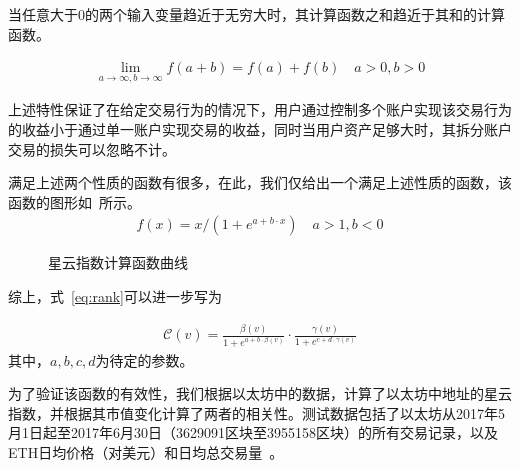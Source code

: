 \begin{property}
\label{prop:two}
当任意大于$0$的两个输入变量趋近于无穷大时，其计算函数之和趋近于其和的计算函数。
\end{property}

\begin{align}
\lim\limits_{a \to \infty, b\to \infty} f(a+b) = f(a) + f(b)\quad a>0, b>0
\end{align}

\noindent 上述特性保证了在给定交易行为的情况下，用户通过控制多个账户实现该交易行为的收益小于通过单一账户实现交易的收益，同时当用户资产足够大时，其拆分账户交易的损失可以忽略不计。

\noindent 满足上述两个性质的函数有很多，在此，我们仅给出一个满足上述性质的函数，该函数的图形如~所示。
\begin{align}
f(x) = x/(1 + e^{a + b\cdot x}) \quad a>1,b<0
\end{align}

\begin{figure}
\centering
{}
\caption{星云指数计算函数曲线 \label{fig-nr}}
\end{figure}


\vspace{2em}
综上，式~\ref{eq:rank}可以进一步写为

\begin{align}
\label{eq:rank-param}
\mathcal{C}(v) =  \frac{\beta(v)}{1+e^{a + b \cdot \beta(v)}} \cdot \frac{\gamma(v)}{1+e^{c + d \cdot \gamma(v)}}
\end{align}
\noindent 其中，$a, b, c, d$为待定的参数。

为了验证该函数的有效性，我们根据以太坊中的数据，计算了以太坊中地址的星云指数，并根据其市值变化计算了两者的相关性。测试数据包括了以太坊从2017年5月1日起至2017年6月30日（3629091区块至3955158区块）的所有交易记录，以及ETH日均价格（对美元）和日均总交易量~\cite{coinmarketcap}。


